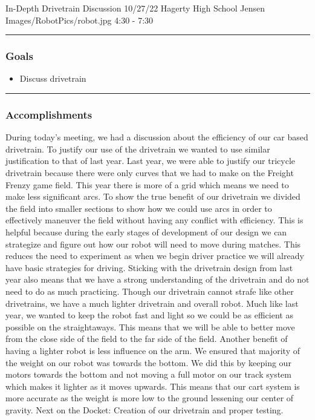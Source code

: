 \insertmeeting 
	{In-Depth Drivetrain Discussion} 
	{10/27/22}
	{Hagerty High School}
	{Jensen}
	{Images/RobotPics/robot.jpg}
	{4:30 - 7:30}
	
\noindent\hfil\rule{\textwidth}{.4pt}\hfil
\subsubsection*{Goals}
\begin{itemize}
    \item Discuss drivetrain

\end{itemize} 

\noindent\hfil\rule{\textwidth}{.4pt}\hfil

\subsubsection*{Accomplishments}
During today's meeting, we had a discussion about the efficiency of our car based drivetrain. To justify our use of the drivetrain we wanted to use similar justification to that of last year. Last year, we were able to justify our tricycle drivetrain because there were only curves that we had to make on the Freight Frenzy game field. This year there is more of a grid which means we need to make less significant arcs. To show the true benefit of our drivetrain we divided the field into smaller sections to show how we could use arcs in order to effectively maneuver the field without having any conflict with efficiency. This is helpful because during the early stages of development of our design we can strategize and figure out how our robot will need to move during matches. This reduces the need to experiment as when we begin driver practice we will already have basic strategies for driving. Sticking with the drivetrain design from last year also means that we have a strong understanding of the drivetrain and do not need to do as much practicing. Though our drivetrain cannot strafe like other drivetrains, we have a much lighter drivetrain and overall robot. Much like last year, we wanted to keep the robot fast and light so we could be as efficient as possible on the straightaways. This means that we will be able to better move from the close side of the field to the far side of the field. Another benefit of having a lighter robot is less influence on the arm. We ensured that majority of the weight on our robot was towards the bottom. We did this by keeping our motors towards the bottom and not moving a full motor on our track system which makes it lighter as it moves upwards. This means that our cart system is more accurate as the weight is more low to the ground lessening our center of gravity.
Next on the Docket: Creation of our drivetrain and proper testing.

